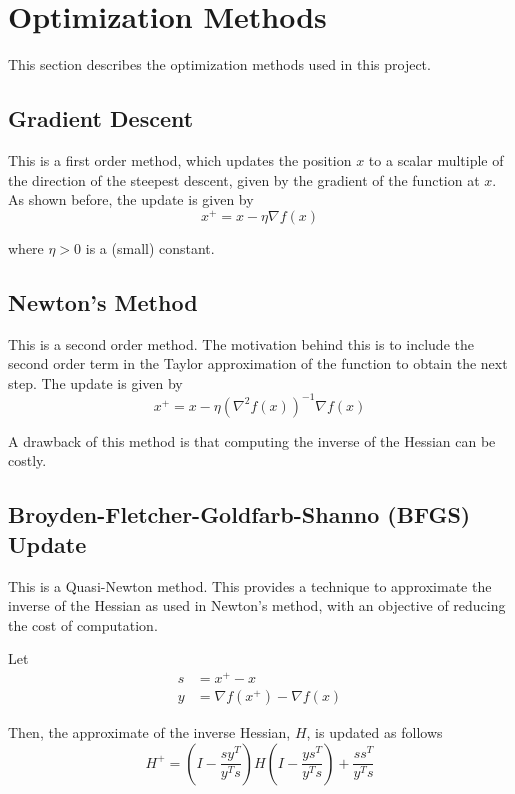 \documentclass{article}
\begin{document}
\section{Optimization Methods}\label{opt}
This section describes the optimization methods used in this project.

\subsection{Gradient Descent}
This is a first order method, which updates the position $x$ to a scalar multiple of the direction of the steepest descent, given by the gradient of the function at $x$. As shown before, the update is given by
\begin{equation}
x^+ = x - \eta \nabla f(x)
\end{equation}

where $\eta > 0$ is a (small) constant.

\subsection{Newton's Method}
This is a second order method. The motivation behind this is to include the second order term in the Taylor approximation of the function to obtain the next step. The update is given by
\begin{equation}
x^+ = x - \eta \left(\nabla^2 f(x) \right)^{-1}\nabla f(x)
\end{equation}

A drawback of this method is that computing the inverse of the Hessian can be costly.

\subsection{Broyden-Fletcher-Goldfarb-Shanno (BFGS) Update}
This is a Quasi-Newton method. This provides a technique to approximate the inverse of the Hessian as used in Newton's method, with an objective of reducing the cost of computation.

Let
\begin{align}
s &= x^+ - x \\
y &= \nabla f(x^+) - \nabla f(x)
\end{align}

Then, the approximate of the inverse Hessian, $H$, is updated as follows
\begin{equation}
H^+ = \left(I - \frac{sy^T}{y^Ts}\right)H\left(I-\frac{ys^T}{y^Ts}\right)+\frac{ss^T}{y^Ts}
\end{equation}
\end{document}
